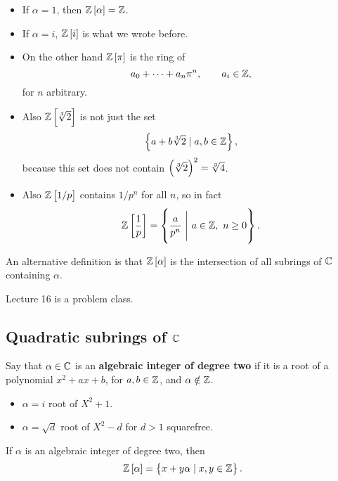 \begin{example*}
\hfill
\begin{itemize}
\item If $ \alpha = 1 $, then $ \Z\sbr{\alpha} = \Z $.
\item If $ \alpha = i $, $ \Z\sbr{i} $ is what we wrote before.
\item On the other hand $ \Z\sbr{\pi} $ is the ring of
$$ a_0 + \dots + a_n\pi^n, \qquad a_i \in \mathbb{Z}, $$
for $ n $ arbitrary.
\item Also $ \Z\sbr{\sqrt[3]{2}} $ is not just the set
$$ \cbr{a + b\sqrt[3]{2} \mid a, b \in \Z}, $$
because this set does not contain $ \br{\sqrt[3]{2}}^2 = \sqrt[3]{4} $.
\item Also $ \Z\sbr{1 / p} $ contains $ 1 / p^n $ for all $ n $, so in fact
$$ \Z\sbr{\dfrac{1}{p}} = \cbr{\dfrac{a}{p^n} \ \Bigg| \ a \in \Z, \ n \ge 0}. $$
\end{itemize}
\end{example*}

An alternative definition is that $ \Z\sbr{\alpha} $ is the intersection of all subrings of $ \mathbb{C} $ containing $ \alpha $.


Lecture 16 is a problem class.


\subsection{Quadratic subrings of $ \mathbb{C} $}

\begin{definition}
Say that $ \alpha \in \mathbb{C} $ is an \textbf{algebraic integer of degree two} if it is a root of a polynomial $ x^2 + ax + b $, for $ a, b \in \mathbb{Z} $, and $ \alpha \notin \mathbb{Z} $.
\end{definition}

\begin{example*}
\hfill
\begin{itemize}
\item $ \alpha = i $ root of $ X^2 + 1 $.
\item $ \alpha = \sqrt{d} $ root of $ X^2 - d $ for $ d > 1 $ squarefree.
\end{itemize}
\end{example*}

\pagebreak

\begin{proposition}
If $ \alpha $ is an algebraic integer of degree two, then
$$ \Z\sbr{\alpha} = \cbr{x + y\alpha \mid x, y \in \Z}. $$
\end{proposition}

